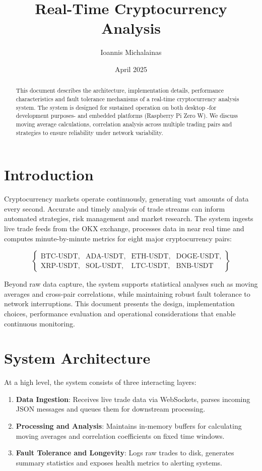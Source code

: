 \documentclass{article}
\title{Real-Time Cryptocurrency Analysis}
\author{Ioannis Michalainas}
\date{April 2025}
\begin{document}
\maketitle

\begin{abstract}
This document describes the architecture, implementation details, performance characteristics and fault tolerance mechanisms of a real-time cryptocurrency analysis system. The system is designed for sustained operation on both desktop -for development purposes- and embedded platforms (Raspberry Pi Zero W). We discuss moving average calculations, correlation analysis across multiple trading pairs and strategies to ensure reliability under network variability.
\end{abstract}

\tableofcontents

\section{Introduction}
Cryptocurrency markets operate continuously, generating vast amounts of data every second. Accurate and timely analysis of trade streams can inform automated strategies, risk management and market research. The system ingests live trade feeds from the OKX exchange, processes data in near real time and computes minute-by-minute metrics for eight major cryptocurrency pairs:

\[
\left\{
\begin{array}{cccc}
\text{BTC-USDT}, & \text{ADA-USDT}, & \text{ETH-USDT}, & \text{DOGE-USDT}, \\
\text{XRP-USDT}, & \text{SOL-USDT}, & \text{LTC-USDT}, & \text{BNB-USDT}
\end{array}
\right\}
\]

Beyond raw data capture, the system supports statistical analyses such as moving averages and cross-pair correlations, while maintaining robust fault tolerance to network interruptions. This document presents the design, implementation choices, performance evaluation and operational considerations that enable continuous monitoring.


\section{System Architecture}
At a high level, the system consists of three interacting layers:
\begin{enumerate}
  \item \textbf{Data Ingestion}: Receives live trade data via WebSockets, parses incoming JSON messages and queues them for downstream processing.
  \item \textbf{Processing and Analysis}: Maintains in-memory buffers for calculating moving averages and correlation coefficients on fixed time windows.
  \item \textbf{Fault Tolerance and Longevity}: Logs raw trades to disk, generates summary statistics and exposes health metrics to alerting systems.
\end{enumerate}
\end{document}
